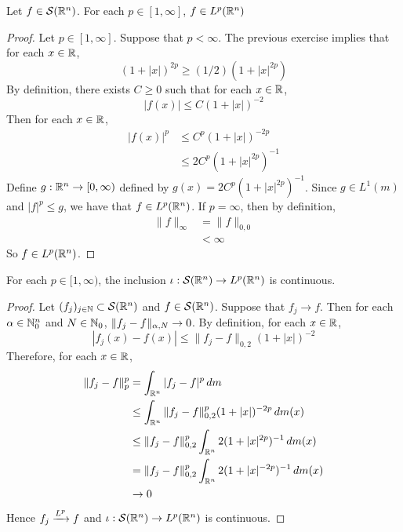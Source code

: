 \documentclass{book}
\begin{document}
	\begin{ex} 
		Let $f \in \mathcal{S}(\mathbb{R}^n)$. For each $p \in [1, \infty]$, $f \in  L^p(\mathbb{R}^n)$
	\end{ex}

	\begin{proof}
		Let $p \in [1, \infty]$. Suppose that $p < \infty$. The previous exercise implies that for each $x \in \mathbb{R}$, 
		$$(1 + |x|)^{2p} \geq (1/2) (1 + |x|^{2p})$$
		By definition, there exists $C \geq 0$ such that for each $x \in \mathbb{R}$, 
		$$|f(x)| \leq C(1+|x|)^{-2} $$
		Then for each $x \in \mathbb{R}$,
		\begin{align*}
			|f(x)|^p 
			& \leq C^p(1+|x|)^{-2p} \\
			& \leq 2C^p(1+|x|^{2p})^{-1}
		\end{align*}
		Define $g:\mathbb{R}^n \rightarrow [0,\infty)$ defined by $g(x) = 2C^{p}(1+|x|^{2p})^{-1}$. Since $g \in L^1(m)$ and $|f|^p \leq g$, we have that $f \in L^p(\mathbb{R}^n)$. If $p = \infty$, then by definition, 
		\begin{align*}
			\|f\|_\infty 
			& = \|f\|_{0,0} \\
			& < \infty 
		\end{align*}
		So $f \in L^p(\mathbb{R}^n)$. 
	\end{proof}

	\begin{ex} 
		For each $p \in [1, \infty)$, the inclusion $\iota: \mathcal{S}(\mathbb{R}^n) \rightarrow L^p(\mathbb{R}^n)$ is continuous. 
	\end{ex}

	\begin{proof}
		Let $(f_j)_{j \in \mathbb{N}} \subset \mathcal{S}(\mathbb{R}^n)$ and $f \in \mathcal{S}(\mathbb{R}^n)$. Suppose that $f_j \rightarrow f$. Then for each $\alpha \in \mathbb{N}_0^n$ and $N \in \mathbb{N}_0$, $\|f_j -f \|_{\alpha, N} \rightarrow 0$. By definition, for each $x \in \mathbb{R}$, 
		$$|f_j(x) - f(x)| \leq \|f_j - f\|_{0, 2} (1 + |x|)^{-2}$$
		Therefore, for each $x \in \mathbb{R}$, 
		\begin{align*}
			\|f_j - f\|_{p}^p 
			& = \int_{\mathbb{R}^n} |f_j - f|^p \, d m \\
			& \leq \int_{\mathbb{R}^n} \|f_j - f\|_{0, 2}^p (1 + |x|)^{-2p} \, d m(x) \\
			& \leq \|f_j - f\|_{0, 2}^p \int_{\mathbb{R}^n}  2(1 + |x|^{2p})^{-1} \, d m(x) \\
			& = \|f_j - f\|_{0, 2}^p \int_{\mathbb{R}^n}  2(1 + |x|^{-2p})^{-1} \, d m(x) \\
			& \rightarrow 0
		\end{align*}
		Hence $f_j \xrightarrow{L^p} f$ and $\iota: \mathcal{S}(\mathbb{R}^n) \rightarrow L^p(\mathbb{R}^n)$ is continuous.
	\end{proof}
\end{document}
